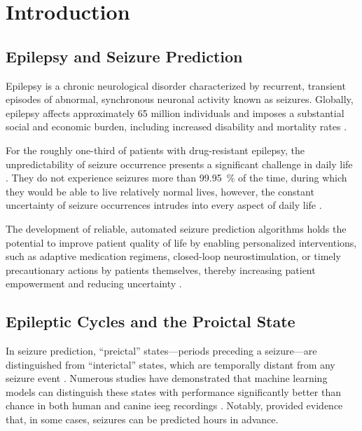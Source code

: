 \chapter{Introduction}\label{ch:introduction}
\section{Epilepsy and Seizure Prediction}
Epilepsy is a chronic neurological disorder characterized by recurrent, transient episodes of abnormal, synchronous neuronal activity known as seizures.
Globally, epilepsy affects approximately 65 million individuals and imposes a substantial social and economic burden, including increased disability and mortality rates \parencite{leonardi_global_2002, feigin_global_2021}.

For the roughly one-third of patients with drug-resistant epilepsy, the unpredictability of seizure occurrence presents a significant challenge in daily life \parencite{schulze-bonhage_unpredictability_2008}.
They do not experience seizures more than \SI{99.95}{\percent} of the time, during which they would be able to live relatively normal lives, however, the constant uncertainty of seizure occurrences intrudes into every aspect of daily life \parencite{freestone_forward-looking_2017}.

The development of reliable, automated seizure prediction algorithms holds the potential to improve patient quality of life by enabling personalized interventions, such as adaptive medication regimens, closed-loop neurostimulation, or timely precautionary actions by patients themselves, thereby increasing patient empowerment and reducing uncertainty \parencite{mormann_seizure_2007}.


\section{Epileptic Cycles and the Proictal State}
In seizure prediction, \enquote{preictal} states---periods preceding a seizure---are distinguished from \enquote{interictal} states, which are temporally distant from any seizure event \parencite{yang_seizure_2024}.
Numerous studies have demonstrated that machine learning models can distinguish these states with performance significantly better than chance in both human and canine \gls{ieeg} recordings \parencite{brinkmann_crowdsourcing_2016, kuhlmann_epilepsyecosystemorg_2018}.
Notably, \textcite{cook_prediction_2013} provided evidence that, in some cases, seizures can be predicted hours in advance.

